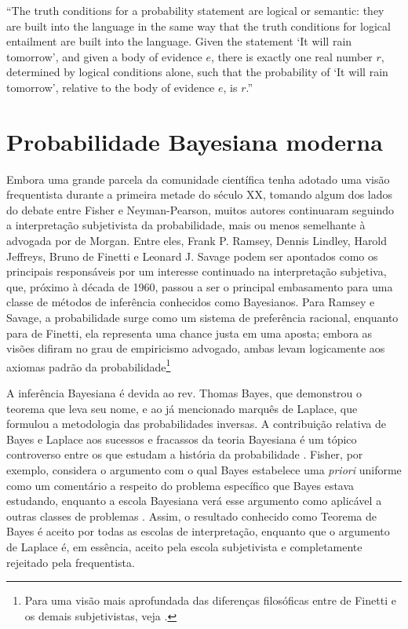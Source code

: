 \begin{shaded}
``The truth conditions for a probability statement are logical or semantic: they are built into the language in the same
way that the truth conditions for logical entailment are built into the language. Given the statement `It will rain tomorrow',
and given a body of evidence $e$, there is exactly one real number $r$, determined by logical conditions alone, such
that the probability of `It will rain tomorrow', relative to the body of evidence $e$, is $r$.'' \citep{Kyburg74}


\end{shaded}

\section{Probabilidade Bayesiana moderna}\label{sec:bayes}

Embora uma grande parcela da comunidade científica tenha adotado uma visão frequentista durante a primeira metade do século XX,
tomando algum dos lados do debate entre Fisher e Neyman-Pearson, muitos autores continuaram seguindo a interpretação 
subjetivista da probabilidade, mais ou menos semelhante à advogada por de Morgan. Entre eles, Frank P. Ramsey, Dennis Lindley,
Harold Jeffreys, Bruno de Finetti e Leonard J. Savage
podem ser apontados como os principais responsáveis por um interesse continuado na interpretação subjetiva, que, próximo à
década de 1960, passou a ser o principal embasamento para uma classe de métodos de inferência conhecidos como Bayesianos. 
Para Ramsey e Savage, a probabilidade surge como um sistema de preferência racional, enquanto para de Finetti, ela representa
uma chance justa em uma aposta; embora as visões difiram no grau de empiricismo advogado,
ambas levam logicamente aos axiomas padrão da probabilidade\footnote{Para uma visão mais aprofundada das diferenças
filosóficas entre de Finetti e os demais subjetivistas, veja \citep{Galavotti89}.}

A inferência Bayesiana é devida ao rev. Thomas Bayes, que demonstrou o teorema que leva seu nome, e ao já mencionado marquês de
Laplace, que formulou a metodologia das probabilidades inversas. A contribuição relativa de Bayes e Laplace aos sucessos
e fracassos da teoria Bayesiana é um tópico controverso	entre os que estudam a história da probabilidade \citep{Zabell09}.
Fisher, por exemplo, considera o argumento com o qual Bayes estabelece uma {\em priori} uniforme como um comentário
a respeito do problema específico que Bayes estava estudando, enquanto a escola Bayesiana verá esse argumento
como aplicável a outras classes de problemas \citep{Aldrich08}. Assim, o resultado conhecido como Teorema de Bayes é aceito
por todas as escolas de interpretação, enquanto que o argumento de Laplace 
é, em essência, aceito pela escola subjetivista e completamente rejeitado pela frequentista. 

